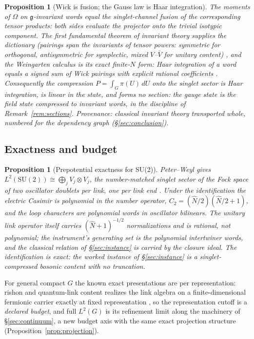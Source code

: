 \documentclass[11pt]{article}
\newtheorem{proposition}[theorem]{Proposition}
\theoremstyle{definition}
\theoremstyle{remark}
\newcommand{\g}{\mathfrak{g}}
\begin{document}
\begin{proposition}[Wick is fusion; the Gauss law is Haar integration]
\label{prop:wickfusion}
The moments of $\Omega$ on $\g$-invariant words equal the
singlet-channel fusion of the corresponding tensor products: both sides
evaluate the projector onto the trivial isotypic component.  The first
fundamental theorem of invariant theory supplies the dictionary
(pairings span the invariants of tensor powers: symmetric for
orthogonal, antisymmetric for symplectic, mixed $V$--$\bar V$ for
unitary content) \cite{weylbook}, and the Weingarten calculus is its
exact finite-$N$ form: Haar integration of a word equals a signed sum
of Wick pairings with explicit rational coefficients
\cite{collinssniady}.  Consequently the compression
$P = \int_G \pi(U)\, dU$ onto the singlet sector is Haar integration,
is linear in the state, and forms no section: the gauge state is the
field state compressed to invariant words, in the discipline of
Remark~\ref{rem:sections}.  Provenance: classical invariant theory
transported whole, numbered for the dependency graph
(\S\ref{sec:conclusion}).
\end{proposition}

\subsection{Exactness and budget}
\begin{proposition}[Prepotential exactness for SU(2)]\label{prop:prepot}
Peter--Weyl gives $L^2(\mathrm{SU}(2)) \cong \bigoplus_j V_j \otimes
V_j$, the number-matched singlet sector of the Fock space of two
oscillator doublets per link, one per link end \cite{schwinger,mathur}.
Under the identification the electric Casimir is polynomial in the
number operator, $C_2 = (\hat N/2)(\hat N/2 + 1)$, and the loop
characters are polynomial words in oscillator bilinears.  The unitary
link operator itself carries $(\hat N + 1)^{-1/2}$ normalizations and
is rational, not polynomial; the instrument's generating set is the
polynomial intertwiner words, and the classical relation of
\S\ref{sec:instance} is carried by the closure ideal.  The
identification is exact: the worked instance of \S\ref{sec:instance}
is a singlet-compressed bosonic content with no truncation.
\end{proposition}

For general compact $G$ the known exact presentations are per
representation: rishon and quantum-link content realizes the link
algebra on a finite-dimensional fermionic carrier exactly at fixed
representation \cite{quantumlink}, so the representation cutoff is a
\emph{declared budget}, and full $L^2(G)$ is its refinement limit along
the machinery of \S\ref{sec:continuum}, a new budget axis with the same
exact projection structure (Proposition~\ref{prop:projection}).
\end{document}
